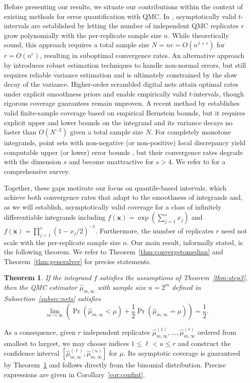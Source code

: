\documentclass{article}
\newtheorem{theorem}{Theorem}
\theoremstyle{definition}
\renewcommand{\leq}{\leqslant}
\newcommand{\bsx}{\boldsymbol{x}}
\begin{document}
Before presenting our results, we  situate our contributions within the context of existing methods for error quantification with QMC. In \cite{10.1145/3643847}, asymptotically valid $t$-intervals are established by letting the number of independent QMC replicates $r$ grow polynomially with the per-replicate sample size $n$. While theoretically sound, this approach requires a total sample size $N=nr= O(n^{1+c}) $ for $ r = O(n^c)$, resulting in suboptimal convergence rates.  An alternative approach by \cite{gobet2022mean} introduces robust estimation techniques to handle non-normal errors, but still requires reliable variance estimation and is ultimately constrained by the slow decay of the variance. Higher-order scrambled digital nets \cite{dick:2011} attain optimal rates under explicit smoothness priors and enable empirically valid $t$-intervals, though rigorous coverage guarantees remain unproven. A recent method by \cite{jain2025empirical} establishes valid finite-sample coverage based on empirical Bernstein bounds, but it requires explicit upper and lower bounds on the integrand and its variance decays no faster than $O(N^{-2})$ given a total sample size $N$. For completely monotone integrands, point sets with non-negative (or non-positive) local discrepancy yield computable upper (or lower) error bounds \cite{10.1093/imaiai/iaae021}, but their convergence rates degrade with the dimension $s$ and become unattractive for $s > 4$. We refer to \cite{owen2025errorestimationquasimontecarlo} for a comprehensive survey. 

Together, these gaps motivate our focus on quantile-based intervals, which achieve both convergence rates that adapt to the smoothness of integrands and, as we will establish, asymptotically valid coverage for a class of infinitely differentiable integrands including $f(\bsx)=\exp(\sum_{j=1}^s x_j)$ and $f(\bsx)=\prod_{j=1}^s (1-x_j/2)^{-1}$. Furthermore, the number of replicates $r$ need not scale with the per-replicate sample size $n$. Our main result, informally stated, is the following theorem. We refer to Theorem~\ref{thm:convergetomedian} and Theorem~\ref{thm:generalver} for precise statements.
\begin{theorem}\label{thm:shortver}
    If the integrand $f$ satisfies the assumptions of Theorem~\ref{thm:step3}, then the QMC estimator $\hat{\mu}_{m,\infty}$ with sample size $n=2^m$ defined in Subsection~\ref{subsec:nets} satisfies
    $$\lim_{m\to\infty}\left(\Pr(\hat{\mu}_{m,\infty}<\mu)+\frac{1}{2}\Pr(\hat{\mu}_{m,\infty}=\mu)\right)=\frac{1}{2}.$$
\end{theorem}
As a consequence, given $r$ independent replicates $\hat{\mu}^{(1)}_{m,\infty},\dots, \hat{\mu}^{(r)}_{m,\infty}$ ordered from smallest to largest,
we may choose indices $1\leq \ell< u\leq r$ and construct the confidence interval $[\hat{\mu}^{(\ell)}_{m,\infty},\hat{\mu}^{(u)}_{m,\infty}]$ for $\mu$. Its asymptotic coverage is guaranteed by Theorem~\ref{thm:shortver} and follows directly from the binomial distribution. Precise expressions are given in Corollary~\ref{cor:confint}.
  
\end{document}
